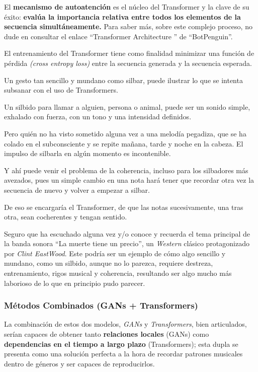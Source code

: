 El \textbf{mecanismo de autoatención} es el núcleo del Transformer y la clave de su éxito: \textbf{evalúa la importancia relativa entre todos los elementos de la secuencia simultáneamente.} Para saber más, sobre este complejo proceso, no dude en consultar el enlace ``Transformer Architecture '' de ``BotPenguin''\cite{botpenguin2025}.

El entrenamiento del Transformer tiene como finalidad minimizar una función de pérdida \emph{(cross entropy loss)} entre la secuencia generada y la secuencia esperada.

\begin{tcolorbox}[title=Silbar es cosa de niños,colback=gray!10, colframe=gray!50, sharp corners=south]

Un gesto tan sencillo y mundano como silbar, puede ilustrar lo que se intenta subsanar con el uso de Transformers.

Un silbido para llamar a alguien, persona o animal, puede ser un sonido simple, exhalado con fuerza, con un tono y una intensidad definidos.

Pero quién no ha visto sometido alguna vez a una melodía pegadiza, que se ha colado en el subconsciente y se repite mañana, tarde y noche en la cabeza. El impulso de silbarla en algún momento es incontenible.

Y ahí puede venir el problema de la coherencia, incluso para los silbadores más avezados, pues un simple cambio en una nota hará tener que recordar otra vez la secuencia de nuevo y volver a empezar a silbar.

De eso se encargaría el Transformer, de que las notas sucesivamente, una tras otra, sean cocherentes y tengan sentido.

Seguro que ha escuchado alguna vez y/o conoce y recuerda el tema principal de la banda sonora ``La muerte tiene un precio'', un \emph{Western} clásico protagonizado por \emph{Clint EastWood}. Este podría ser un ejemplo de cómo algo sencillo y mundano, como un silbido, aunque no lo parezca, requiere destreza, entrenamiento, rigos musical y coherencia, resultando ser algo mucho más laborioso de lo que en principio pudo parecer.

\end{tcolorbox}

\subsubsection{Métodos Combinados (GANs + Transformers)}

La combinación de estos dos modelos, \textit{GANs} y \textit{Transformers}, bien articulados, serían capaces de obtener tanto \textbf{relaciones locales} (GANs) como \textbf{dependencias en el tiempo a largo plazo} (Transformers); esta dupla se presenta como una solución perfecta a la hora de recordar patrones musicales dentro de géneros y ser capaces de reproducirlos.

